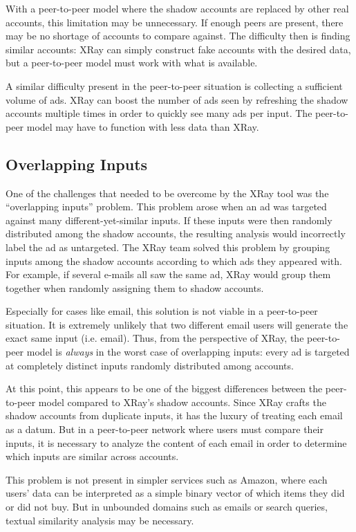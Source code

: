 \documentclass{article}
\begin{document}
With a peer-to-peer model where the shadow accounts are replaced by other real
accounts, this limitation may be unnecessary. If enough peers are present, there
may be no shortage of accounts to compare against. The difficulty then is
finding similar accounts: XRay can simply construct fake accounts with the
desired data, but a peer-to-peer model must work with what is available.

A similar difficulty present in the peer-to-peer situation is collecting a
sufficient volume of ads. XRay can boost the number of ads seen by refreshing
the shadow accounts multiple times in order to quickly see many ads per input.
The peer-to-peer model may have to function with less data than XRay.

\subsection{Overlapping Inputs}\label{olap}

One of the challenges that needed to be overcome by the XRay tool was the
``overlapping inputs'' problem. This problem arose when an ad was targeted
against many different-yet-similar inputs. If these inputs were then randomly
distributed among the shadow accounts, the resulting analysis would incorrectly
label the ad as untargeted. The XRay team solved this problem by grouping inputs
among the shadow accounts according to which ads they appeared with. For
example, if several e-mails all saw the same ad, XRay would group them together
when randomly assigning them to shadow accounts.

Especially for cases like email, this solution is not viable in a peer-to-peer
situation. It is extremely unlikely that two different email users will generate
the exact same input (i.e. email). Thus, from the perspective of XRay, the
peer-to-peer model is {\it always} in the worst case of overlapping inputs:
every ad is targeted at completely distinct inputs randomly distributed among
accounts.

At this point, this appears to be one of the biggest differences between the
peer-to-peer model compared to XRay's shadow accounts. Since XRay crafts the
shadow accounts from duplicate inputs, it has the luxury of treating each email
as a datum. But in a peer-to-peer network where users must compare their inputs,
it is necessary to analyze the content of each email in order to determine which
inputs are similar across accounts.

This problem is not present in simpler services such as Amazon, where each
users' data can be interpreted as a simple binary vector of which items they did
or did not buy. But in unbounded domains such as emails or search queries,
textual similarity analysis may be necessary.
\end{document}
